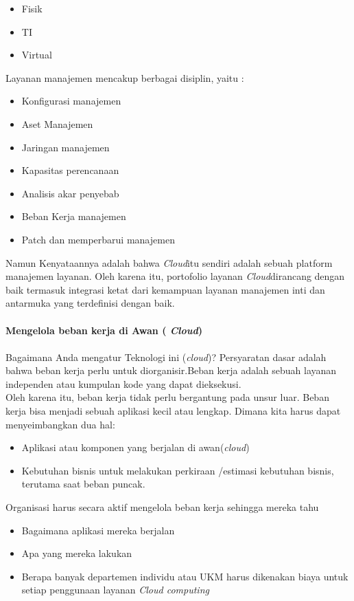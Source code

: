 \begin{itemize}
\item Fisik
\item TI
\item Virtual
\end{itemize}
Layanan manajemen mencakup berbagai  disiplin,  yaitu :\\
\begin{itemize}
\item Konfigurasi  manajemen
\item Aset Manajemen
\item Jaringan manajemen
\item Kapasitas  perencanaan
\item Analisis akar penyebab
\item Beban Kerja manajemen
\item Patch dan memperbarui manajemen
\end{itemize}
Namun Kenyataannya adalah bahwa \textit{Cloud}itu sendiri adalah sebuah platform manajemen layanan. Oleh karena itu, portofolio layanan \textit{Cloud}dirancang dengan baik  termasuk integrasi ketat dari  kemampuan layanan manajemen inti dan antarmuka yang terdefinisi dengan baik.\\\\
\textbf{Mengelola beban kerja di Awan ( \textit{Cloud})}\\\\
Bagaimana Anda mengatur Teknologi ini (\textit{cloud})? Persyaratan dasar adalah bahwa beban kerja perlu untuk diorganisir.Beban kerja adalah sebuah layanan independen atau kumpulan kode yang dapat dieksekusi.\\
Oleh karena itu, beban kerja tidak perlu bergantung pada unsur luar. Beban kerja bisa menjadi sebuah aplikasi kecil atau lengkap. Dimana kita harus dapat menyeimbangkan dua hal:\\
\begin{itemize}
\item Aplikasi atau komponen yang berjalan di awan(\textit{cloud})
\item Kebutuhan bisnis untuk melakukan perkiraan /estimasi kebutuhan bisnis, terutama saat beban puncak.
\end{itemize} 
Organisasi harus secara aktif mengelola beban kerja sehingga mereka tahu\\
\begin{itemize}
\item Bagaimana aplikasi  mereka berjalan
\item Apa yang mereka lakukan
\item Berapa banyak departemen individu atau UKM harus dikenakan biaya untuk setiap penggunaan layanan \textit{Cloud computing}
\end{itemize}
